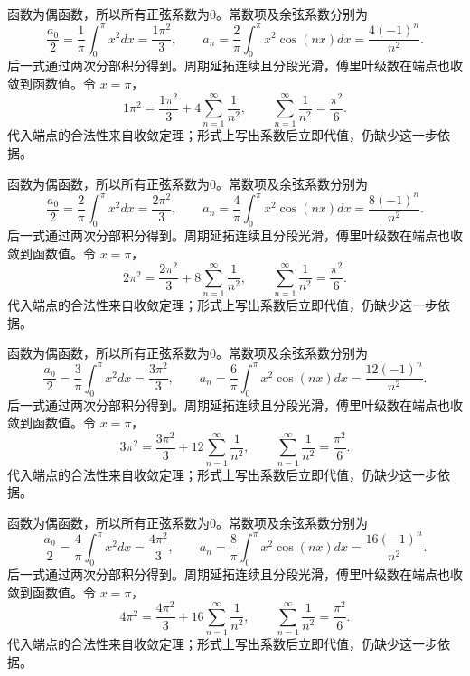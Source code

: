\documentclass[12pt,fontset=fandol]{ctexart}
\begin{document}
\begin{solve}\label{ans:c28q19}
函数为偶函数，所以所有正弦系数为0。常数项及余弦系数分别为
\[
\frac{a_0}2=\frac{1}\pi\int_0^\pi x^2dx=\frac{1\pi^2}3,\qquad a_n=\frac{2}\pi\int_0^\pi x^2\cos(nx)dx=\frac{4(-1)^n}{n^2}.
\]
后一式通过两次分部积分得到。周期延拓连续且分段光滑，傅里叶级数在端点也收敛到函数值。令 $x=\pi$，
\[
1\pi^2=\frac{1\pi^2}3+4\sum_{n=1}^\infty\frac1{n^2},\qquad\sum_{n=1}^\infty\frac1{n^2}=\frac{\pi^2}6.
\]
代入端点的合法性来自收敛定理；形式上写出系数后立即代值，仍缺少这一步依据。
\end{solve}

\begin{solve}\label{ans:c28q20}
函数为偶函数，所以所有正弦系数为0。常数项及余弦系数分别为
\[
\frac{a_0}2=\frac{2}\pi\int_0^\pi x^2dx=\frac{2\pi^2}3,\qquad a_n=\frac{4}\pi\int_0^\pi x^2\cos(nx)dx=\frac{8(-1)^n}{n^2}.
\]
后一式通过两次分部积分得到。周期延拓连续且分段光滑，傅里叶级数在端点也收敛到函数值。令 $x=\pi$，
\[
2\pi^2=\frac{2\pi^2}3+8\sum_{n=1}^\infty\frac1{n^2},\qquad\sum_{n=1}^\infty\frac1{n^2}=\frac{\pi^2}6.
\]
代入端点的合法性来自收敛定理；形式上写出系数后立即代值，仍缺少这一步依据。
\end{solve}

\begin{solve}\label{ans:c28q21}
函数为偶函数，所以所有正弦系数为0。常数项及余弦系数分别为
\[
\frac{a_0}2=\frac{3}\pi\int_0^\pi x^2dx=\frac{3\pi^2}3,\qquad a_n=\frac{6}\pi\int_0^\pi x^2\cos(nx)dx=\frac{12(-1)^n}{n^2}.
\]
后一式通过两次分部积分得到。周期延拓连续且分段光滑，傅里叶级数在端点也收敛到函数值。令 $x=\pi$，
\[
3\pi^2=\frac{3\pi^2}3+12\sum_{n=1}^\infty\frac1{n^2},\qquad\sum_{n=1}^\infty\frac1{n^2}=\frac{\pi^2}6.
\]
代入端点的合法性来自收敛定理；形式上写出系数后立即代值，仍缺少这一步依据。
\end{solve}

\begin{solve}\label{ans:c28q22}
函数为偶函数，所以所有正弦系数为0。常数项及余弦系数分别为
\[
\frac{a_0}2=\frac{4}\pi\int_0^\pi x^2dx=\frac{4\pi^2}3,\qquad a_n=\frac{8}\pi\int_0^\pi x^2\cos(nx)dx=\frac{16(-1)^n}{n^2}.
\]
后一式通过两次分部积分得到。周期延拓连续且分段光滑，傅里叶级数在端点也收敛到函数值。令 $x=\pi$，
\[
4\pi^2=\frac{4\pi^2}3+16\sum_{n=1}^\infty\frac1{n^2},\qquad\sum_{n=1}^\infty\frac1{n^2}=\frac{\pi^2}6.
\]
代入端点的合法性来自收敛定理；形式上写出系数后立即代值，仍缺少这一步依据。
\end{solve}
\end{document}
